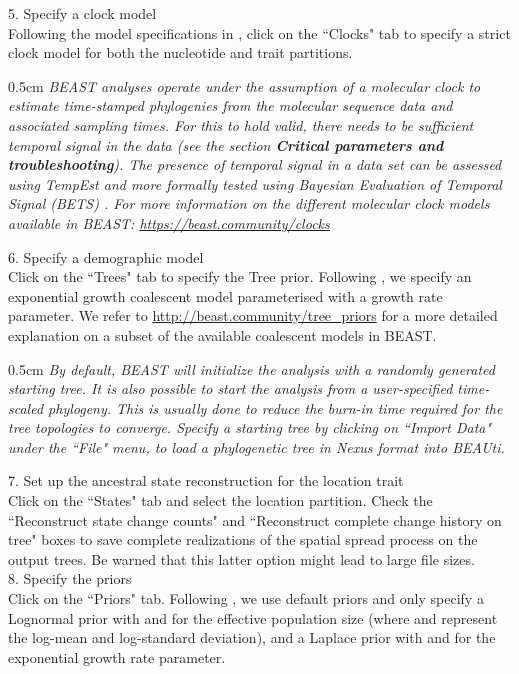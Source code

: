 \documentclass{article}
\newcommand{\ann}[1]{
\begin{adjustwidth}{0.5cm}{}
\it{#1}\\
\end{adjustwidth}}
\newcommand{\code}[1]{
{\upshape\ttfamily{#1}}}
\begin{document}
5. Specify a clock model\\

Following the model specifications in \cite{travhist}, click on the ``Clocks" tab to specify a strict clock model for both the nucleotide and trait partitions.\\
\ann{BEAST analyses operate under the assumption of a molecular clock to estimate time-stamped phylogenies from the molecular sequence data and associated sampling times.
For this to hold valid, there needs to be sufficient temporal signal in the data (see the section \textbf{Critical parameters and troubleshooting}).
The presence of temporal signal in a data set can be assessed using TempEst \cite{tempest} and more formally tested using Bayesian Evaluation of Temporal Signal (BETS) \cite{bets}.
For more information on the different molecular clock models available in BEAST: {\upshape\url{https://beast.community/clocks}}}

6. Specify a demographic model\\

Click on the ``Trees" tab to specify the Tree prior. Following \cite{travhist}, we specify an exponential growth coalescent model parameterised with a growth rate parameter.
We refer to \url{http://beast.community/tree_priors} for a more detailed explanation on a subset of the available coalescent models in BEAST. \\

\ann{By default, BEAST will initialize the analysis with a randomly generated starting tree. It is also possible to start the analysis from a user-specified time-scaled phylogeny. This is usually done to reduce the burn-in time required for the tree topologies to converge. Specify a starting tree by clicking on ``Import Data" under the ``File" menu, to load a phylogenetic tree in Nexus format into BEAUti.}

7. Set up the ancestral state reconstruction for the location trait\\

Click on the ``States" tab and select the location partition.
Check the ``Reconstruct state change counts" and ``Reconstruct complete change history on tree" boxes to save complete realizations of the spatial spread process on the output trees.
Be warned that this latter option might lead to large file sizes.\\

8. Specify the priors \\

Click on the ``Priors" tab. Following \cite{travhist}, we use default priors and only specify a Lognormal prior with\code{mu=1} and\code{sigma=10} for the effective population size (where\code{mu} and \code{sigma} represent the log-mean and log-standard deviation), and a Laplace prior with\code{mean=0} and\code{scale=100} for the exponential growth rate parameter.\\
\end{document}
